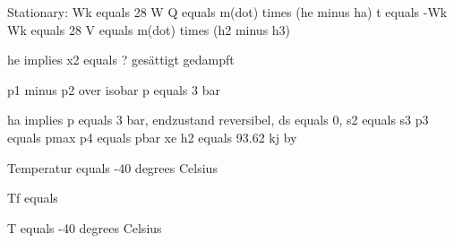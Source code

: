 Stationary:  
Wk equals 28 W  
Q equals m(dot) times (he minus ha)  
t equals -Wk  
Wk equals 28 V equals m(dot) times (h2 minus h3)  

he implies x2 equals ?  
gesättigt gedampft  

p1 minus p2 over isobar  
p equals 3 bar  

ha implies p equals 3 bar, endzustand reversibel, ds equals 0, s2 equals s3  
p3 equals pmax  
p4 equals pbar xe  
h2 equals 93.62 kj by  

Temperatur equals -40 degrees Celsius  

Tf equals  

T equals -40 degrees Celsius